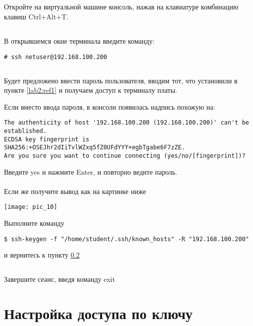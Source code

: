 \subsection{}Откройте на виртуальной машине консоль, нажав на клавиатуре комбинацию клавиш Ctrl+Alt+T. 

\subsection{}\label{lab2:ref2}В открывшемся окне терминала введите команду: 
\begin{lstlisting}[style=bash]
# ssh netuser@192.168.100.200
\end{lstlisting}

\subsection{}Будет предложено ввести пароль пользователя, вводим тот, что установили в пункте \ref{lab2:ref1} и получаем доступ к терминалу платы.

Если вместо ввода пароля, в консоли появилась надпись похожую на:
\begin{lstlisting}[style=stdout]
The authenticity of host '192.168.100.200 (192.168.100.200)' can't be established.
ECDSA key fingerprint is SHA256:+OSEJhr2dIiTvlWZxq5fZ0UFdYYY+egbTgabe6F7zZE.
Are you sure you want to continue connecting (yes/no/[fingerprint])?
\end{lstlisting}
Введите yes и нажмите Enter, и повторно ведите пароль.
\\\\
Если же получите вывод как на картинке ниже
\begin{center}
	\texttt{[image: pic\_10]}
\end{center}
Выполните команду 
\begin{lstlisting}[style=bash]
$ ssh-keygen -f "/home/student/.ssh/known_hosts" -R "192.168.100.200"
\end{lstlisting}
и вернитесь к пункту \ref{lab2:ref2}

\subsection{}Завершите сеанс, введя команду exit 

\section{Настройка доступа по ключу}

